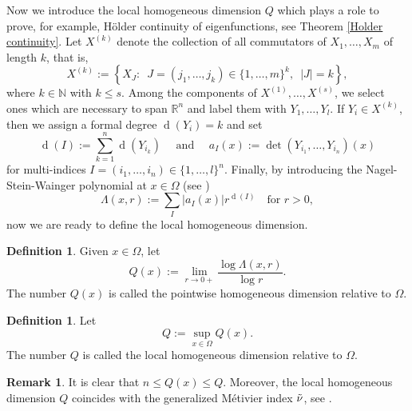 \documentclass[a4paper,12pt,reqno]{amsart}
\numberwithin{equation}{section}
\theoremstyle{plain}
\theoremstyle{definition}
\newtheorem{definition}[theorem]{Definition}
\newtheorem{remark}[theorem]{Remark}
\begin{document}
Now we introduce the local homogeneous dimension $Q$ which plays a  role to prove, for example, H\"older continuity of eigenfunctions, see Theorem \ref{Holder continuity}. Let $X^{(k)}$ denote the collection of all commutators of  $X_{1}, \ldots, X_{m}$ of length $k$, that is,
$$
X^{(k)}:=\left\{X_{J} :\enspace J=\left(j_1, \ldots, j_k\right)\in\{1, \ldots, m\}^{k}, \enspace |J|=k \right\},
$$
where $k\in \mathbb{N}$ with $k\leq s$. Among the components of $X^{(1)},\ldots,X^{(s)}$, we select ones which are necessary to span $\mathbb{R}^{n}$ and label them with $Y_{1},\ldots,Y_{l}$. If $Y_{i}\in X^{(k)}$, then we assign a formal degree $\operatorname{d}(Y_i)=k$ and set
$$
\operatorname{d}(I):=\sum_{k=1}^n \operatorname{d}\left(Y_{i_k}\right) \quad \text { and } \quad a_{I}(x):=\det\left(Y_{i_1}, \ldots, Y_{i_n}\right)(x)
$$
for  multi-indices $I=\left(i_1, \ldots, i_n\right) \in\{1, \ldots, l\}^{n}$. Finally, by introducing the Nagel-Stein-Wainger polynomial at $x\in\Omega$ (see \cite{NSW1985})
$$
\Lambda(x, r):=\sum_{I}\left|a_{I}(x)\right| r^{\operatorname{d}(I)} \quad \text{for } r>0,
$$
now we are ready to define the local homogeneous dimension.
\begin{definition}\cite[p. 1771]{capogna1993embedding}
Given $x\in\Omega$, let  
\begin{equation*}
Q(x):=\lim _{r \rightarrow 0+} \frac{\log \Lambda(x, r)}{\log r}.
\end{equation*}
The number $Q(x)$ is called the pointwise homogeneous dimension relative to $\Omega$. 
\end{definition}

\begin{definition}\cite[p. 1771]{capogna1993embedding}
Let 
\begin{equation*}
Q:=\sup _{x \in \Omega} Q(x).
\end{equation*}   
The number $Q$ is called the local homogeneous dimension relative to $\Omega$.
\end{definition}
\begin{remark}
It is clear that $n\leq Q(x)\leq Q$. Moreover, the local homogeneous dimension $Q$ coincides with the generalized M\'etivier index $\Tilde{\nu}$, see \cite[Proposition 2.2 and Definition 1.2]{Chen2019}.
\end{remark}
\end{document}
